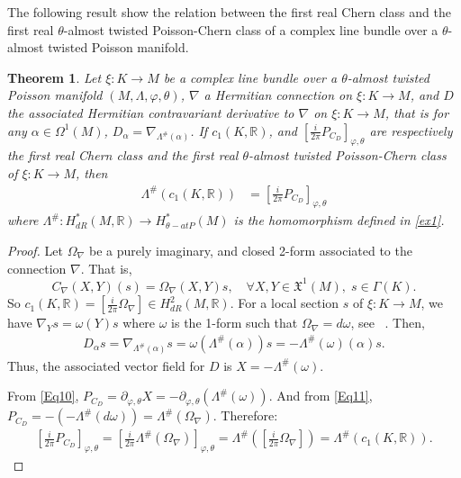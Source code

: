 \documentclass[a4paper,10pt]{article}
\numberwithin{equation}{section}
\theoremstyle{plain}
\newtheorem{theorem}{Theorem}[section]
\newcommand{\dR}{dR}
\newcommand{\CD}{C_D}
\newcommand{\PCD}{P_{\CD}}
\begin{document}
	The following result show the relation between the first real Chern class and  the  first real $\theta$-almost twisted Poisson-Chern class of a complex line bundle over a $\theta$-almost twisted Poisson manifold.
	\begin{theorem}\label{theo3.2}
		Let $\xi: K\to M$ be   a complex line bundle over a $\theta$-almost twisted Poisson manifold $(M,\Lambda,\varphi,\theta)$, $\nabla$ a Hermitian connection  on $\xi: K\to M$, and $D$ the associated Hermitian contravariant derivative to $\nabla$ on $\xi: K\to M$, that is for any $\alpha\in \Omega^1(M)$, $D_\alpha=\nabla_{\Lambda^\#(\alpha)}$.   If $c_1(K,\mathbb{R})$, and $[\frac{i}{2\pi}P_{C_D}]_{\varphi,\theta}$ are respectively the first real Chern class and the first real $\theta$-almost twisted Poisson-Chern class of $\xi: K\to M$, then
		\begin{align}
		\Lambda^\#(c_1(K,\mathbb{R}))&=\left[\frac{i}{2\pi}P_{C_D}\right]_{\varphi,\theta}
		\end{align}
		where $ \Lambda^\#: H_{dR}^{*}(M,\mathbb{R}) \longrightarrow  H_{\theta-atP}^{*}(M)$ is the homomorphism  defined in \eqref{ex1}.
	\end{theorem}
	\begin{proof}
		Let \(\Omega_\nabla\) be  a   purely imaginary, and  closed 2-form associated to the connection $\nabla$. That is,
		\[
		C_\nabla(X,Y)(s) = \Omega_\nabla(X,Y)s, \quad \forall X,Y \in \mathfrak{X}^1(M),\;  s \in \Gamma(K).
		\]
		So  \(c_1(K, \mathbb{R}) = \left[\frac{i}{2\pi} \Omega_\nabla\right] \in H^2_{\dR}(M,\mathbb{R})\). For a local section \(s\) of $\xi: K\to M$,  we have
		$\nabla_Y s = \omega(Y) s$  where $\omega$ is the 1-form such that   $\Omega_\nabla = d\omega$, see ~\cite{R23}.
		Then,
		\begin{align*}
		D_\alpha s = \nabla_{\Lambda^\#(\alpha)} s= \omega(\Lambda^\#(\alpha)) s = -\Lambda^\#(\omega)(\alpha)s.
		\end{align*}
		Thus, the associated  vector field for \(D\) is \(X = -\Lambda^\#(\omega)\).
		
		From \eqref{Eq10},
		$\PCD = \partial_{\varphi,\theta} X = -\partial_{\varphi,\theta} (\Lambda^\#(\omega))$. And from \eqref{Eq11},
		$\PCD = -(-\Lambda^\#(d\omega)) = \Lambda^\#(\Omega_\nabla)$. Therefore:
		\begin{align*}
		\left[\frac{i}{2\pi} \PCD\right]_{\varphi,\theta} = \left[\frac{i}{2\pi} \Lambda^\#(\Omega_\nabla)\right]_{\varphi,\theta}= \Lambda^\#\left(\left[\frac{i}{2\pi} \Omega_\nabla\right]\right)= \Lambda^\#(c_1(K, \mathbb{R})).
		\end{align*}
	\end{proof}
	
\end{document}
